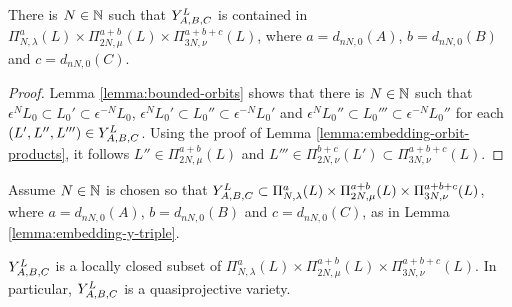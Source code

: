 \documentclass[a4paper, 11pt]{report}
\begin{document}
\begin{lemma}\label{lemma:embedding-y-triple}
There is $N\in\naturals$ such that $\yprod[L]{A,B,C}$ is contained in $\Pi_{N,\lambda}^a(L)\times\Pi_{2N,\mu}^{a+b}(L)\times\Pi_{3N,\nu}^{a+b+c}(L)$, where $a=d_{nN,0}{(A)}$, $b=d_{nN,0}{(B)}$ and $c=d_{nN,0}{(C)}$.
\end{lemma}

\begin{proof}
Lemma \ref{lemma:bounded-orbits} shows that there is $N\in\naturals$ such that $\epsilon^N L_0\subset L_0'\subset\epsilon^{-N}L_0$, $\epsilon^N L_0'\subset L_0''\subset\epsilon^{-N}L_0'$ and $\epsilon^N L_0''\subset L_0'''\subset\epsilon^{-N}L_0''$ for each $(L',L'',L''')\in\yprod[L]{A,B,C}$. Using the proof of Lemma \ref{lemma:embedding-orbit-products}, it follows $L''\in\Pi_{2N,\mu}^{a+b}(L)$ and $L'''\in\Pi_{2N,\nu}^{b+c}(L')\subset\Pi_{3N,\nu}^{a+b+c}(L)$.
\end{proof}

Assume $N\in\naturals$ is chosen so that $\yprod[L]{A,B,C}\subset\Pi_{N,\lambda}^a(L)\times\Pi_{2N,\mu}^{a+b}(L)\times\Pi_{3N,\nu}^{a+b+c}(L)$, where $a=d_{nN,0}{(A)}$, $b=d_{nN,0}{(B)}$ and $c=d_{nN,0}{(C)}$, as in Lemma \ref{lemma:embedding-y-triple}.

\begin{lemma}\label{lemma:y-triple-is-quasiprojective}
$\yprod[L]{A,B,C}$ is a locally closed subset of $\Pi_{N,\lambda}^a(L)\times\Pi_{2N,\mu}^{a+b}(L)\times\Pi_{3N,\nu}^{a+b+c}(L)$. In particular, $\yprod[L]{A,B,C}$ is a quasiprojective variety.
\end{lemma}
\end{document}
